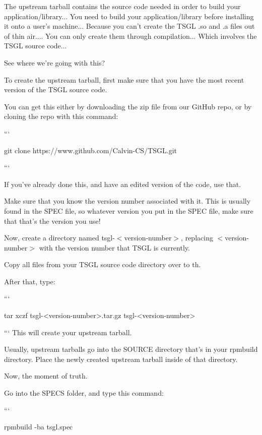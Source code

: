 The upstream tarball contains the source code needed in order to build your application/library... You need to build your application/library before installing it onto a user's machine... Because you can't create the T\-S\-G\-L .so and .a files out of thin air.... You can only create them through compilation... Which involves the T\-S\-G\-L source code...

See where we're going with this?

To create the upstream tarball, first make sure that you have the most recent version of the T\-S\-G\-L source code.

You can get this either by downloading the zip file from our Git\-Hub repo, or by cloning the repo with this command\-:

``` \begin{DoxyVerb}git clone https://www.github.com/Calvin-CS/TSGL.git
\end{DoxyVerb}


```

If you've already done this, and have an edited version of the code, use that.

Make sure that you know the version number associated with it. This is usually found in the S\-P\-E\-C file, so whatever version you put in the S\-P\-E\-C file, make sure that that's the version you use!

Now, create a directory named {\ttfamily tsgl-\/$<$version-\/number$>$}, replacing {\ttfamily $<$version-\/number$>$} with the version number that T\-S\-G\-L is currently.

Copy all files from your T\-S\-G\-L source code directory over to th.

After that, type\-:

``` \begin{DoxyVerb}tar xczf tsgl-<version-number>.tar.gz tsgl-<version-number>
\end{DoxyVerb}


``` This will create your upstream tarball.

Usually, upstream tarballs go into the {\ttfamily S\-O\-U\-R\-C\-E} directory that's in your {\ttfamily rpmbuild} directory. Place the newly created upstream tarball inside of that directory.

Now, the moment of truth.

Go into the {\ttfamily S\-P\-E\-C\-S} folder, and type this command\-:

``` \begin{DoxyVerb}rpmbuild -ba tsgl.spec
\end{DoxyVerb}


